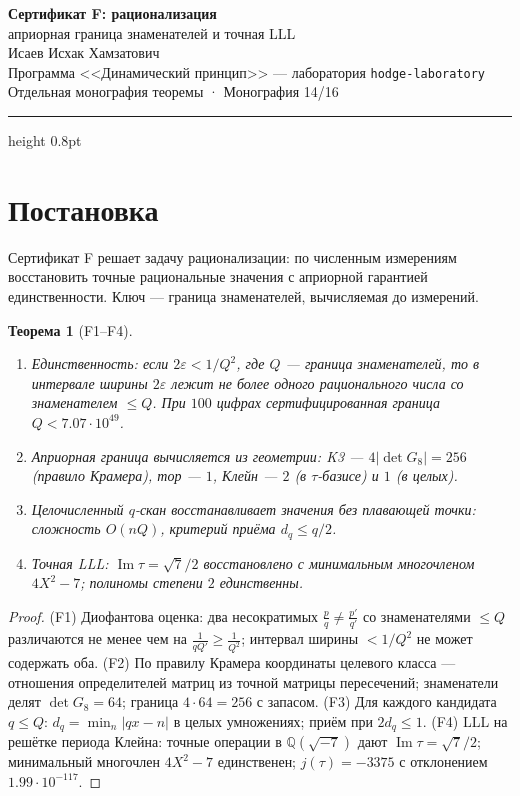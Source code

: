 \documentclass[11pt,a4paper]{article}
\theoremstyle{plain}
\newtheorem{theorem}{Теорема}
\theoremstyle{definition}
\theoremstyle{remark}
\newcommand{\QQ}{\mathbb{Q}}
\newcommand{\im}{\operatorname{Im}}
\begin{document}
\begin{center}
{\LARGE\bfseries Сертификат F: рационализация}\\[0.4em]
{\large априорная граница знаменателей и точная LLL}\\[0.6em]
{\normalsize Исаев Исхак Хамзатович}\\[0.2em]
{\small Программа <<Динамический принцип>> --- лаборатория \texttt{hodge-laboratory}}\\[0.15em]
{\small Отдельная монография теоремы · Монография 14/16}
\end{center}
\vspace{0.4em}
{\color{linkblue}\hrule height 0.8pt}
\vspace{0.8em}

\section{Постановка}

Сертификат F решает задачу рационализации: по численным измерениям
восстановить точные рациональные значения с априорной гарантией
единственности. Ключ --- граница знаменателей, вычисляемая до
измерений.

\begin{theorem}[F1--F4]\label{th:Fstand}
\begin{enumerate}[leftmargin=2em]
\item[(F1)] Единственность: если $2\varepsilon<1/Q^2$, где $Q$ ---
граница знаменателей, то в интервале ширины $2\varepsilon$ лежит не
более одного рационального числа со знаменателем $\le Q$. При $100$
цифрах сертифицированная граница $Q<7.07\cdot10^{49}$.
\item[(F2)] Априорная граница вычисляется из геометрии: K3 ---
$4|\det G_8|=256$ (правило Крамера), тор --- $1$, Клейн --- $2$
(в $\tau$-базисе) и $1$ (в целых).
\item[(F3)] Целочисленный $q$-скан восстанавливает значения без
плавающей точки: сложность $O(nQ)$, критерий приёма $d_q\le q/2$.
\item[(F4)] Точная LLL: $\im\tau=\sqrt7/2$ восстановлено с
минимальным многочленом $4X^2-7$; полиномы степени $2$
единственны.
\end{enumerate}
\end{theorem}

\begin{proof}
(F1) Диофантова оценка: два несократимых $\frac pq\ne\frac{p'}{q'}$
со знаменателями $\le Q$ различаются не менее чем на
$\frac1{qQ'}\ge\frac1{Q^2}$; интервал ширины $<1/Q^2$ не может
содержать оба.
(F2) По правилу Крамера координаты целевого класса --- отношения
определителей матриц из точной матрицы пересечений; знаменатели
делят $\det G_8=64$; граница $4\cdot64=256$ с запасом.
(F3) Для каждого кандидата $q\le Q$: $d_q=\min_n|qx-n|$ в целых
умножениях; приём при $2d_q\le1$.
(F4) LLL на решётке периода Клейна: точные операции в
$\QQ(\sqrt{-7})$ дают $\im\tau=\sqrt7/2$; минимальный многочлен
$4X^2-7$ единственен; $j(\tau)=-3375$ с отклонением
$1.99\cdot10^{-117}$.
\end{proof}
\end{document}
